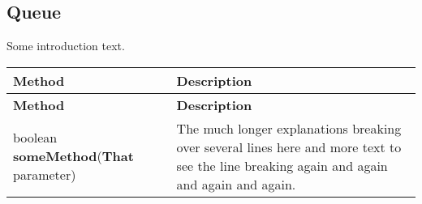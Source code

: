 \documentclass[main]{subfiles}
\begin{document}

\subsection{Queue}
\renewcommand{\arraystretch}{1.5}


Some introduction text.

\scriptsize
\begin{longtable}{p{0.4\linewidth} p{0.6\linewidth}}
\hline \textbf{Method} & \textbf{Description}\\ \hline
\endfirsthead

\hline \textbf{Method} & \textbf{Description}\\ \hline\hline
\endhead
boolean \textbf{someMethod}(\textbf{That} parameter) & The much longer explanations breaking over several lines here and more text to see the line breaking again and again and again and again.\\
\end{longtable}
\todo[inline]{}
\end{document}
